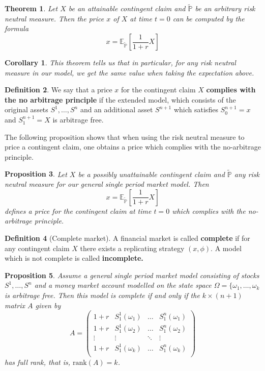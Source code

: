 \documentclass[10pt, oneside, reqno]{amsart}
\theoremstyle{plain}%
\newtheorem{thm}{Theorem}[subsection]
\newtheorem{prop}[thm]{Proposition}
\newtheorem*{cor}{Corollary}
\theoremstyle{definition}
\newtheorem{defn}[thm]{Definition}
\theoremstyle{remark}
\newcommand{\expp}[1]{\mathbb{E}_{\rnm}\left[#1\right]}
\newcommand{\rnm}{\tilde{\mathbb{P}}}
\begin{document}
\begin{thm}
	Let $X$ be an attainable contingent claim and $\rnm$ be an arbitrary risk neutral measure.  Then the price $x$ of $X$ at time $t = 0$ can be computed by the formula \[
		x = \expp{\frac{1}{1+r} X}
	\]
\end{thm}
\begin{cor}
	This theorem tells us that in particular, for any risk neutral measure in our model, we get the same value when taking the expectation above.
\end{cor}


\begin{defn}
	We say that a price $x$ for the contingent claim $X$ \textbf{complies with the no arbitrage principle} if the extended model, which consists of the original assets $S^1,\dots,S^n$ and an additional asset $S^{n+1}$ which satisfies $S^{n+1}_0 = x$ and $S^{n+1}_1 = X$ is arbitrage free.
\end{defn}

The following proposition shows that when using the risk neutral measure to price a contingent claim, one obtains a price which complies with the no-arbitrage principle.

\begin{prop}
	Let $X$ be a possibly unattainable contingent claim and $\rnm$ any risk neutral measure for our general single period market model.  Then \[
		x = \expp{\frac{1}{1+r}X}
	\]
	defines a price for the contingent claim at time $t=0$ which complies with the no-arbitrage principle.
\end{prop}

\begin{defn}[Complete market]
A financial market is called \textbf{complete} if for any contingent claim $X$ there exists a replicating strategy $(x,\phi)$.  A model which is not complete is called \textbf{incomplete.}
\end{defn}


\begin{prop}
	Assume a general single period market model consisting of stocks $S^1, \dots, S^n$
 and a money market account modelled on the state space $\Omega = \{ \omega_1,\dots,\omega_k $ is arbitrage free.  Then this model is complete if and only if the $k \times (n+1)$ matrix $A$ given by \[
 	A = \begin{pmatrix}
 		1 +r & S^1_1 (\omega_1) & \ldots & S^n_1(\omega_1) \\
 		1 +r & S^1_1 (\omega_2) & \ldots & S^n_1(\omega_2) \\
		\vdots & \vdots 		& \ddots & \vdots  \\
 		1 +r & S^1_1 (\omega_k) & \ldots & S^n_1(\omega_k) \\

 	\end{pmatrix}
 \] has full rank, that is, $\text{rank}(A) = k$.
\end{prop}
\end{document}
